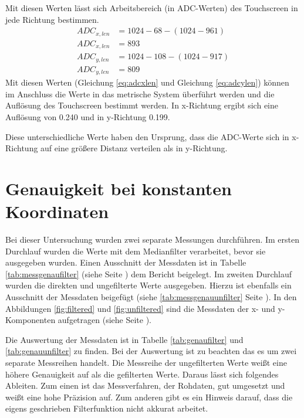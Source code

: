 Mit diesen Werten lässt sich Arbeitsbereich (in ADC-Werten) des Touchscreen in jede Richtung bestimmen.
\begin{align}
    ADC_{x,len} &= 1024 - 68 -(1024-961)\nonumber\\
    ADC_{x,len} &= 893\label{eq:adcxlen}\\
    ADC_{y,len} &= 1024-108-(1024-917)\nonumber\\
    ADC_{y,len} &= 809\label{eq:adcylen}
\end{align}
Mit diesen Werten (Gleichung \ref{eq:adcxlen} und Gleichung \ref{eq:adcylen}) können im Anschluss die Werte in das metrische System überführt werden und die Auflösung des Touchscreen bestimmt werden.
In x-Richtung ergibt sich eine Auflösung von \SI{0,240}{} und in y-Richtung \SI{0,199}{}.

Diese unterschiedliche Werte haben den Ursprung, dass die ADC-Werte sich in x-Richtung auf eine größere Distanz verteilen als in y-Richtung.

\section{Genauigkeit bei konstanten Koordinaten}
\label{ab:genau}
Bei dieser Untersuchung wurden zwei separate Messungen durchführen. Im ersten Durchlauf wurden die Werte mit dem Medianfilter verarbeitet, bevor sie ausgegeben wurden. Einen Ausschnitt der Messdaten ist in Tabelle \ref{tab:messgenaufilter} (siehe Seite \pageref{tab:messgenaufilter}) dem Bericht beigelegt.
Im zweiten Durchlauf wurden die direkten und ungefilterte Werte ausgegeben. Hierzu ist ebenfalls ein Ausschnitt der Messdaten beigefügt (siehe \ref{tab:messgenauunfilter} Seite \pageref{tab:messgenauunfilter}). 
In den Abbildungen \ref{fig:filtered} und \ref{fig:unfiltered} sind die Messdaten der x- und y-Komponenten aufgetragen (siehe Seite \pageref{fig:filtered}).

Die Auswertung der Messdaten ist in Tabelle \ref{tab:genaufilter} und \ref{tab:genauunfilter} zu finden.
Bei der Auswertung ist zu beachten das es um zwei separate Messreihen handelt. 
Die Messreihe der ungefilterten Werte weißt eine höhere Genauigkeit auf als die gefilterten Werte. Daraus lässt sich folgendes Ableiten. 
Zum einen ist das Messverfahren, der Rohdaten, gut umgesetzt und weißt eine hohe Präzision auf. Zum anderen gibt es ein Hinweis darauf, dass die eigens geschrieben Filterfunktion nicht akkurat arbeitet.



